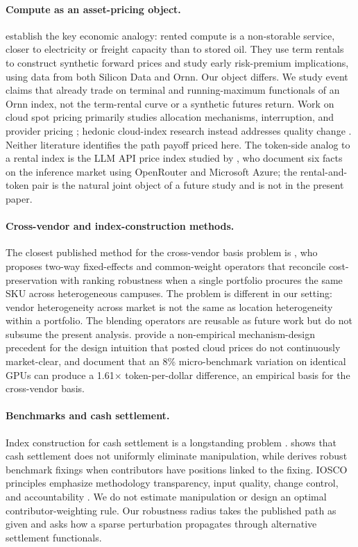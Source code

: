 \documentclass[10pt,twocolumn]{article}
\begin{document}
\paragraph{Compute as an asset-pricing object.}
\citet{bandisu2026} establish the key economic analogy: rented compute is a
non-storable service, closer to electricity or freight capacity than to stored
oil. They use term rentals to construct synthetic forward prices and study
early risk-premium implications, using data from both Silicon Data and Ornn.
Our object differs. We study event claims that already trade on terminal and
running-maximum functionals of an Ornn index, not the term-rental curve or a
synthetic futures return. Work on cloud spot pricing primarily studies
allocation mechanisms, interruption, and provider pricing \citep{li2017};
hedonic cloud-index research instead addresses quality change
\citep{byrne2018}. Neither literature identifies the path payoff priced here.
The token-side analog to a rental index is the LLM API price index studied by
\citet{demirer2025}, who document six facts on the inference market using
OpenRouter and Microsoft Azure; the rental-and-token pair is the natural
joint object of a future study and is not in the present paper.

\paragraph{Cross-vendor and index-construction methods.}
The closest published method for the cross-vendor basis problem is
\citet{he2025}, who proposes two-way fixed-effects and common-weight operators
that reconcile cost-preservation with ranking robustness when a single
portfolio procures the same SKU across heterogeneous campuses. The problem
is different in our setting: vendor heterogeneity across market is not the
same as location heterogeneity within a portfolio. The blending operators
are reusable as future work but do not subsume the present analysis.
\citet{bergemanndeb2025} provide a non-empirical mechanism-design precedent
for the design intuition that posted cloud prices do not continuously
market-clear, and \citet{gpulottery2025} document that an 8\% micro-benchmark
variation on identical GPUs can produce a 1.61$\times$ token-per-dollar
difference, an empirical basis for the cross-vendor basis.

\paragraph{Benchmarks and cash settlement.}
Index construction for cash settlement is a longstanding problem
\citep{shiller1993}. \citet{pirrong2001} shows that cash settlement does not
uniformly eliminate manipulation, while \citet{duffiedworczak2021} derives
robust benchmark fixings when contributors have positions linked to the fixing.
IOSCO principles emphasize methodology transparency, input quality, change
control, and accountability \citep{iosco2013}. We do not estimate manipulation
or design an optimal contributor-weighting rule. Our robustness radius takes
the published path as given and asks how a sparse perturbation propagates
through alternative settlement functionals.
\end{document}
